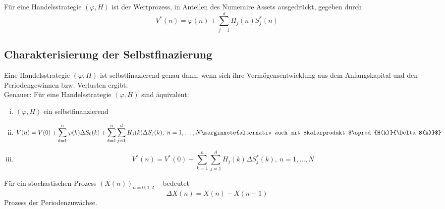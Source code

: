 Für eine Handelsstrategie $(\varphi,H)$ ist der Wertprozess, in Anteilen des Numeraire Assets ausgedrückt, gegeben durch
\[
V^*(n) = \varphi(n)+\sum_{j=1}^{d}H_j(n)S_j^*(n)
\]

\subsection{Charakterisierung der Selbstfinazierung}
\label{sub:charkt_selbstfinanzierung}
Eine Handelsstrategie $(\varphi,H)$ ist selbstfinazierend genau dann, wenn sich ihre Vermögensentwicklung aus dem Anfangskapital und den Periodengewinnen bzw. Verlusten ergibt.\\
Genauer: Für eine Handelsstrategie $(\varphi,H)$ sind äquivalent:
\begin{enumerate}[(i)]
	\item $(\varphi,H)$ ein selbstfinanzierend
	\item 
	\[
	V(n) = V(0)+\sum_{k=1}^{n}\varphi(k)\Delta S_0(k) + \sum_{k=1}^{n}\sum_{j=1}^{d}H_j(k)\Delta S_j(k),~n=1,\dots,N
	\marginnote{alternativ auch mit Skalarprodukt $\sprod{H(k)}{\Delta S(k)}$}
	\]
	\item 
	\[
	V^*(n)= V^*(0)+\sum_{k=1}^{n}\sum_{j=1}^{d} H_j(k)\Delta S_j^*(k),~ n=1,\dots,N
	\]
\end{enumerate}
Für ein stochastischen Prozess $(X(n))_{n=0,1,2,\dots}$ bedeutet 
\[
\Delta X(n)= X(n)-X(n-1)
\]
Prozess der Periodenzuwächse.\\

